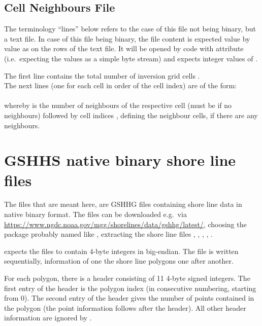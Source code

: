 \subsection{Cell Neighbours File}
The terminology ``lines'' below refers to the case of this file not being binary, but a text file. 
In case of this file being binary, the file content is expected value by value as on the rows of the
text file. It will be opened by  code with attribute 
(i.e.\ expecting the values as a simple byte stream) and expects integer values of .

The first line contains the total number of inversion grid cells .\\
The next  lines (one for each cell in order of the cell index) are of the form:\\
\\
whereby  is the number of neighbours of the respective cell (must be  if 
no neighbours) followed by  cell indices , defining 
the neighbour cells, if there are any neighbours.
%
\section{GSHHS native binary shore line files} \label{files,sec:GSHHS_bin}
%
The files that are meant here, are GSHHG files containing shore line data in native binary format.
The files can be downloaded e.g.\ via 
\url{https://www.ngdc.noaa.gov/mgg/shorelines/data/gshhg/latest/}, choosing the package probably named 
like , extracting the shore line files
, , , , .

\ASKI{} expects the files to contain 4-byte integers in big-endian. The file is written sequentially, 
information of one the shore line polygons one after another. 

For each polygon, there is a header consisting of 11 4-byte signed integers. The first entry of the header
is the polygon index (in consecutive numbering, starting from 0). The second entry of the header gives
the number of points contained in the polygon (the point information follows after the header). 
All other header information are ignored by \ASKI{}.

